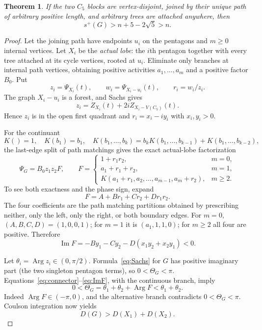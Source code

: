 \documentclass[11pt]{article}
\newtheorem{theorem}{Theorem}[section]
\theoremstyle{remark}
\newcommand{\Arg}{\operatorname{Arg}}
\begin{document}
\begin{theorem}\label{thm:disjoint}
If the two $C_5$ blocks are vertex-disjoint, joined by their unique path of
arbitrary positive length, and arbitrary trees are attached anywhere, then
\[
 s^+(G)>n+5-2\sqrt5>n.
\]
\end{theorem}

\begin{proof}
Let the joining path have endpoints $u_i$ on the pentagons and $m\geq0$
internal vertices.  Let $X_i$ be the \emph{actual lobe}: the $i$th pentagon
together with every tree attached at its cycle vertices, rooted at $u_i$.
Eliminate only branches at internal path vertices, obtaining positive
activities $a_1,\ldots,a_m$ and a positive factor $B_0$.  Put
\[
 z_i=\Psi_{X_i}(t),\qquad w_i=\Psi_{X_i-u_i}(t),\qquad r_i=w_i/z_i.
\]
The graph $X_i-u_i$ is a forest, and Sachs gives
\[
 z_i=Z_{X_i}(t)+2iZ_{X_i-V(C_5)}(t).
\]
Hence $z_i$ is in the open first quadrant and
$r_i=x_i-iy_i$ with $x_i,y_i>0$.

For the continuant
\[
 K()=1,\quad K(b_1)=b_1,\quad
 K(b_1,\ldots,b_k)=b_kK(b_1,\ldots,b_{k-1})+K(b_1,\ldots,b_{k-2}),
\]
the last-edge split of path matchings gives the exact actual-lobe
factorization
\begin{equation}\label{eq:connector}
 \Psi_G=B_0z_1z_2F,
 \qquad F=\begin{cases}
 1+r_1r_2,&m=0,\\
 a_1+r_1+r_2,&m=1,\\
 K(a_1+r_1,a_2,\ldots,a_{m-1},a_m+r_2),&m\geq2.
 \end{cases}
\end{equation}
To see both exactness and the phase sign, expand
\begin{equation}\label{eq:Fexpand}
 F=A+Br_1+Cr_2+Dr_1r_2.
\end{equation}
The four coefficients are the path matching partitions obtained by
prescribing neither, only the left, only the right, or both boundary edges.
For $m=0$, $(A,B,C,D)=(1,0,0,1)$; for $m=1$ it is
$(a_1,1,1,0)$; for $m\geq2$ all four are positive.  Therefore
\begin{equation}\label{eq:ImF}
 \operatorname{Im}F=-By_1-Cy_2-D(x_1y_2+x_2y_1)<0.
\end{equation}

Let $\theta_i=\Arg z_i\in(0,\pi/2)$.  Formula~\eqref{eq:Sachs} for $G$
has positive imaginary part (the two singleton pentagon terms), so
$0<\Theta_G<\pi$.  Equations~\eqref{eq:connector}--\eqref{eq:ImF}, with the
continuous branch, imply
\begin{equation}\label{eq:lobe-phase}
 0<\Theta_G=\theta_1+\theta_2+\Arg F<\theta_1+\theta_2.
\end{equation}
Indeed $\Arg F\in(-\pi,0)$, and the alternative branch contradicts
$0<\Theta_G<\pi$.  Coulson integration now yields
\begin{equation}\label{eq:Dsplit}
 D(G)>D(X_1)+D(X_2).
\end{equation}


\end{proof}
\end{document}
